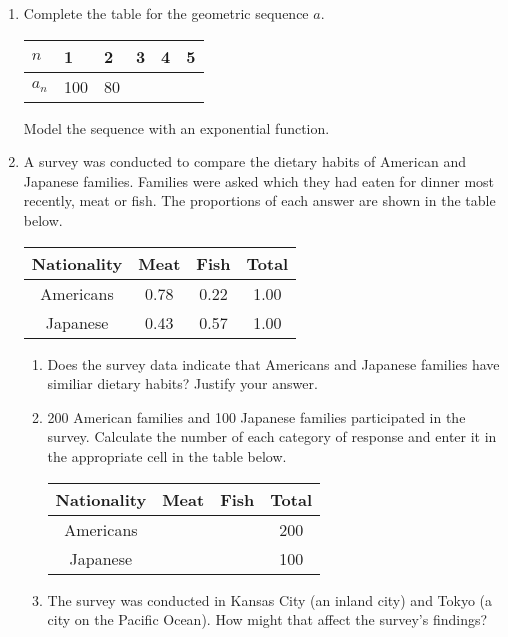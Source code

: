 \documentclass[12pt, twoside]{article}
\begin{document}
\begin{enumerate}[itemsep=0.5cm]
\item Complete the table for the geometric sequence $a$.
    \begin{center}
    \begin{tabular}{|p{1cm}|p{1cm}|p{1cm}|p{1cm}|p{1cm}|p{1cm}|}
        \hline
        $n$ & 1 & 2 & 3 & 4 & 5 \\
        \hline
        $a_n$ & 100 & 80 & & & \\[0.25cm]
        \hline
    \end{tabular}
    \end{center}
    Model the sequence with an exponential function.


\newpage
\item A survey was conducted to compare the dietary habits of American and Japanese families. Families were asked which they had eaten for dinner most recently, meat or fish. The proportions of each answer are shown in the table below.
    \begin{center}
        \begin{tabular}{|c|c|c|c|}
            \hline
            Nationality & Meat & Fish & Total \\[0.2cm]
            \hline
            Americans & 0.78 & 0.22 & 1.00 \\[0.25cm]
            \hline
            Japanese & 0.43 & 0.57 & 1.00 \\[0.25cm]
            \hline
        \end{tabular}
    \end{center}
    \begin{enumerate}
        \item Does the survey data indicate that Americans and Japanese families have similiar dietary habits? Justify your answer. \vspace{2cm}
        \item 200 American families and 100 Japanese families participated in the survey. Calculate the number of each category of response and enter it in the appropriate cell in the table below. 
        \begin{center}
            \begin{tabular}{|c|p{1.5cm}|p{1.5cm}|c|}
                \hline
                Nationality & \; Meat & \; Fish & Total \\[0.2cm]
                \hline
                Americans & &  & 200 \\[0.25cm]
                \hline
                Japanese & &  & 100 \\[0.25cm]
                \hline
            \end{tabular}
        \end{center}
        \item The survey was conducted in Kansas City (an inland city) and Tokyo (a city on the Pacific Ocean). How might that affect the survey's findings? 
    \end{enumerate} \vspace{3cm}


\end{enumerate}
\end{document}
